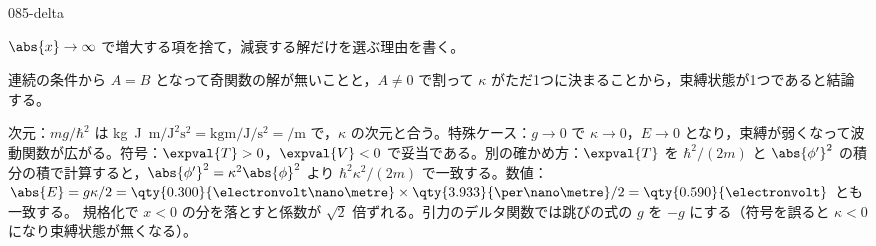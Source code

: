 \documentclass[uplatex,dvipdfmx,a4paper,11pt]{jsarticle}
\begin{document}
\begin{kaisetsu}{085-delta}
\begin{ronten}
  \item {} $\abs{x}\to\infty$ で増大する項を捨て，減衰する解だけを選ぶ理由を書く。
  \item {} 連続の条件から $A=B$ となって奇関数の解が無いことと，$A\ne 0$ で割って $\kappa$ がただ1つに決まることから，束縛状態が1つであると結論する。
\end{ronten}
\kenzan 次元：$mg/\hbar^{2}$ は \unit{\kilogram\joule\metre}$/\unit{\joule\squared\second\squared}=\unit{\kilogram\metre\per\joule\per\second\squared}=\unit{\per\metre}$ で，$\kappa$ の次元と合う。特殊ケース：$g\to 0$ で $\kappa\to 0$，$E\to 0$ となり，束縛が弱くなって波動関数が広がる。符号：$\expval{T}>0$，$\expval{V}<0$ で妥当である。別の確かめ方：$\expval{T}$ を $\hbar^{2}/(2m)$ と $\abs{\phi'}^{2}$ の積分の積で計算すると，$\abs{\phi'}^{2}=\kappa^{2}\abs{\phi}^{2}$ より $\hbar^{2}\kappa^{2}/(2m)$ で一致する。数値：$\abs{E}=g\kappa/2=\qty{0.300}{\electronvolt\nano\metre}\times\qty{3.933}{\per\nano\metre}/2=\qty{0.590}{\electronvolt}$ とも一致する。
\tsumazuki 規格化で $x<0$ の分を落とすと係数が $\sqrt{2}$ 倍ずれる。引力のデルタ関数では跳びの式の $g$ を $-g$ にする（符号を誤ると $\kappa<0$ になり束縛状態が無くなる）。
\end{kaisetsu}
\end{document}
